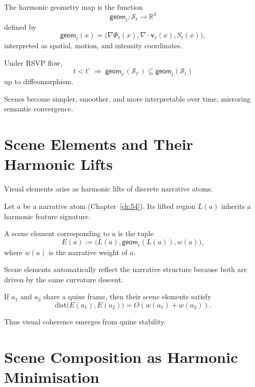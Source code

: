 \begin{definition}
The harmonic geometry map is the function
\[
\mathsf{geom}_t : \mathcal{S}_t \to \mathbb{R}^3
\]
defined by
\[
\mathsf{geom}_t(x) =
\bigl(
  \nabla\Phi_t(x),
  \nabla\cdot\mathbf{v}_t(x),
  S_t(x)
\bigr),
\]
interpreted as spatial, motion, and intensity coordinates.
\end{definition}

\begin{theorem}
Under RSVP flow,
\[
t < t' \;\Longrightarrow\;
\mathsf{geom}_{t'}(\mathcal{S}_{t'}) \subseteq
\mathsf{geom}_t(\mathcal{S}_t)
\]
up to diffeomorphism.
\end{theorem}

Scenes become simpler, smoother, and more interpretable over time, mirroring
semantic convergence.


\section{Scene Elements and Their Harmonic Lifts}
\label{sec:55:elements}

Visual elements arise as harmonic lifts of discrete narrative atoms.

Let $a$ be a narrative atom (Chapter~\ref{ch:54}).  
Its lifted region $L(a)$ inherits a harmonic feature signature.

\begin{definition}
A scene element corresponding to $a$ is the tuple
\[
E(a) :=
\bigl(
  L(a),
  \mathsf{geom}_t(L(a)),
  w(a)
\bigr),
\]
where $w(a)$ is the narrative weight of $a$.
\end{definition}

Scene elements automatically reflect the narrative structure because both are
driven by the same curvature descent.

\begin{theorem}
If $a_1$ and $a_2$ share a quine frame, then their scene elements satisfy
\[
\mathrm{dist}\bigl(E(a_1),E(a_2)\bigr) = O\!\left( w(a_1)+w(a_2) \right).
\]
\end{theorem}

Thus visual coherence emerges from quine stability.


\section{Scene Composition as Harmonic Minimisation}
\label{sec:55:composition}

